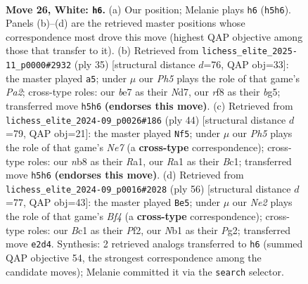 \documentclass[11pt]{article}
\begin{document}
\clearpage

\begin{figure}[p]\centering
\begin{subfigure}{0.46\textwidth}\centering
\resizebox{\linewidth}{!}{%
\newchessgame
\chessboard[
  setfen={rn3r2/1p1kb1pp/4b3/p2pPp1P/8/P5P1/4N1K1/RNB2R2 w - - 0 26},
  showmover=false,
  pgfstyle=straightmove, color=movearrow, markmove={h5-h6}
]}
\caption{}
\end{subfigure}\hfill
\begin{subfigure}{0.46\textwidth}\centering
\resizebox{\linewidth}{!}{%
\newchessgame
\chessboard[
  setfen={r1b2rk1/pp1n2pp/8/2P3B1/4p3/2R5/4PPPP/4KB1R b K - 1 18},
  showmover=false,
  pgfstyle=straightmove, color=movearrow, markmove={a7-a5}
]}
\caption{}
\end{subfigure}
\\[4pt]
\begin{subfigure}{0.46\textwidth}\centering
\resizebox{\linewidth}{!}{%
\newchessgame
\chessboard[
  setfen={1r2nr1k/pb2Nppp/2pb4/8/4P3/8/PP2B1PP/R1B2RK1 w - - 0 23},
  showmover=false,
  pgfstyle=straightmove, color=movearrow, markmove={e7-f5}
]}
\caption{}
\end{subfigure}\hfill
\begin{subfigure}{0.46\textwidth}\centering
\resizebox{\linewidth}{!}{%
\newchessgame
\chessboard[
  setfen={3r3k/pp3Bpp/5b2/5p2/b2p1B1P/P4N2/1P1R1PP1/6K1 w - - 5 29},
  showmover=false,
  pgfstyle=straightmove, color=movearrow, markmove={f4-e5}
]}
\caption{}
\end{subfigure}
\caption{\textbf{Move 26, White: \texttt{h6}.} (a) Our position; Melanie plays \texttt{h6} (\texttt{h5h6}). Panels (b)--(d) are the retrieved master positions whose correspondence most drove this move (highest QAP objective among those that transfer to it). (b) Retrieved from \texttt{lichess\_elite\_2025-11\_p0000\#2932} (ply 35) [structural distance $d$=76, QAP obj=33]: the master played \texttt{a5}; under $\mu$ our \emph{Ph5} plays the role of that game's \emph{Pa2}; cross-type roles: our \emph{b}e7 as their \emph{N}d7, our \emph{r}f8 as their \emph{b}g5; transferred move \texttt{h5h6} \textbf{(endorses this move)}. (c) Retrieved from \texttt{lichess\_elite\_2024-09\_p0026\#186} (ply 44) [structural distance $d$=79, QAP obj=21]: the master played \texttt{Nf5}; under $\mu$ our \emph{Ph5} plays the role of that game's \emph{Ne7} (a \textbf{cross-type} correspondence); cross-type roles: our \emph{n}b8 as their \emph{R}a1, our \emph{R}a1 as their \emph{B}c1; transferred move \texttt{h5h6} \textbf{(endorses this move)}. (d) Retrieved from \texttt{lichess\_elite\_2024-09\_p0016\#2028} (ply 56) [structural distance $d$=77, QAP obj=43]: the master played \texttt{Be5}; under $\mu$ our \emph{Ne2} plays the role of that game's \emph{Bf4} (a \textbf{cross-type} correspondence); cross-type roles: our \emph{B}c1 as their \emph{P}f2, our \emph{N}b1 as their \emph{P}g2; transferred move \texttt{e2d4}. Synthesis: 2 retrieved analogs transferred to \texttt{h6} (summed QAP objective 54, the strongest correspondence among the candidate moves); Melanie committed it via the \texttt{search} selector.}
\label{fig:thought-m50}
\end{figure}
\end{document}
